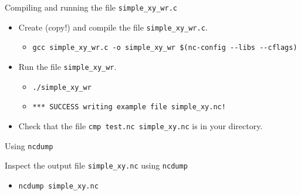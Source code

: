 \documentclass[compress,11pt,xcolor=svgnames,aspectratio=169]{beamer}
\begin{document}
\begin{frame}[fragile]{Compiling and running the file \texttt{simple\_xy\_wr.c}}

\begin{itemize}
\setlength\itemsep{0.6cm}

  \item Create (copy!) and compile the file \verb|simple_xy_wr.c|.

    \begin{itemize}
      \item {\tiny \verb|gcc simple_xy_wr.c -o simple_xy_wr $(nc-config --libs --cflags)|}
    \end{itemize}

  \item Run the file \verb|simple_xy_wr|.

      \begin{itemize}
        \item {\tiny  \verb|./simple_xy_wr|}
        \item {\tiny  \verb|*** SUCCESS writing example file simple_xy.nc!|}\\[0.5cm]
      \end{itemize}

  \item Check that the file \verb|cmp test.nc simple_xy.nc| is in your directory.

\end{itemize}

\end{frame}

\begin{frame}[fragile]{Using \texttt{ncdump}}

Inspect the output file \verb|simple_xy.nc| using \texttt{ncdump}

\begin{itemize}

  \item \verb|ncdump simple_xy.nc|

\end{itemize}

\end{frame}
\end{document}
